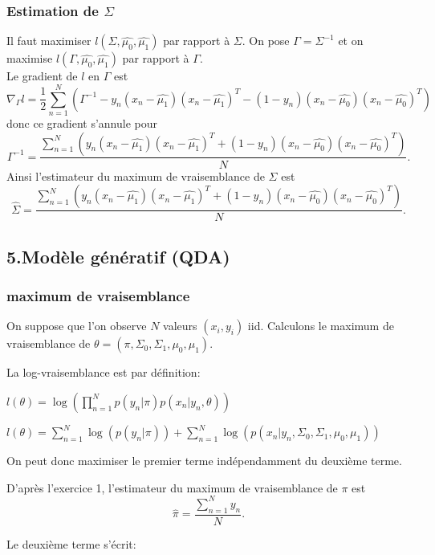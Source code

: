 \documentclass{article}
\begin{document}
\subsubsection{Estimation de $\Sigma$}
Il faut maximiser $l( \Sigma, \hat{\mu_0}, \hat{\mu_1})$ par rapport à
$\Sigma$. On pose $\Gamma=\Sigma^{-1}$ et on maximise $l( \Gamma, \hat{\mu_0}, \hat{\mu_1}) $ par rapport à $\Gamma$.\\
Le gradient de $l$ en $\Gamma$ est $$\nabla_{\Gamma}l=\frac{1}{2} \sum_{n=1}^{N}(\Gamma^{-1}-y_{n}(x_{n}-\hat{\mu_{1}})(x_{n}-\hat{\mu_{1}})^{T}-(1-y_{n})(x_{n}-\hat{\mu_{0}})(x_{n}-\hat{\mu_{0}})^{T})$$
donc ce gradient s'annule pour $$\Gamma^{-1} = \frac{\sum_{n=1}^{N} ( y_{n}(x_{n}-\hat{\mu_{1}})(x_{n}-\hat{\mu_{1}})^{T}+(1-y_{n})(x_{n}-\hat{\mu_{0}})(x_{n}-\hat{\mu_{0}})^{T})}{N}.$$
Ainsi l'estimateur du maximum de vraisemblance de $\Sigma$ est $$\hat{\Sigma} = \frac{\sum_{n=1}^{N} ( y_{n}(x_{n}-\hat{\mu_{1}})(x_{n}-\hat{\mu_{1}})^{T}+(1-y_{n})(x_{n}-\hat{\mu_{0}})(x_{n}-\hat{\mu_{0}})^{T})}{N}.$$

\subsection{5.Modèle génératif (QDA)}
\subsubsection{maximum de vraisemblance }
On suppose que l'on observe $N$ valeurs $(x_i, y_i)$ iid. Calculons le maximum de vraisemblance de $\theta=(\pi, \Sigma_{0}, \Sigma_{1}, \mu_0, \mu_1)$.

La log-vraisemblance est par définition:

$l(\theta) = \log(\prod_{n=1}^N p (y_n | \pi)  p(x_{ n}|y_n, \theta))$

$l(\theta) = \sum_{n=1}^N \log(p(y_n |\pi)) + \sum_{n=1}^{N} \log(p(x_{ n}|y_n,  \Sigma_{0}, \Sigma_{1}, \mu_0, \mu_1))$

On peut donc maximiser le premier terme indépendamment du deuxième terme.

D'après l'exercice 1, l'estimateur du maximum de vraisemblance de $\pi$ est $$\hat{\pi} = \frac{\sum_{n=1}^{N} y_{n}}{N}.$$

Le deuxième terme s'écrit:
\end{document}
